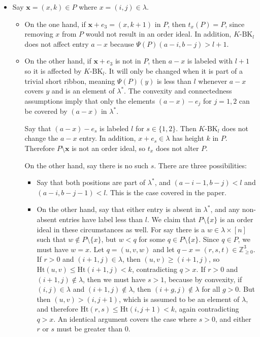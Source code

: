 \documentclass[10pt,letter]{article}
\begin{document}
\begin{itemize}
\item Say $\textbf{x} = (x,k) \in P$ where $x = (i,j) \in \lambda$. 
\begin{itemize}
\item On the one hand, if $\textbf{x} + e_3 = (x,k+1)$ in $P$, then $t_x(P) = P$, since removing $x$ from $P$ would not result in an order ideal. In addition, $K$-$\text{BK}_l$ does not affect entry $a-x$ because $\Psi(P)(a-i,b-j) > l+ 1$. 

\item On the other hand, if $\textbf{x} + e_3$ is not in $P$, then $a-x$ is labeled with $l+1$ so it is affected by $K$-$\text{BK}_l$.  It will only be changed when it is part of a trivial short ribbon, meaning $\Psi(P)(y)$ is less than $l$ whenever $a-x$ covers $y$ and is an element of $\lambda^{\ast}$. The convexity and connectedness assumptions imply that only the elements $(a-x)-e_j$ for $j = 1,2$ can be covered by $(a-x)$ in $\lambda^{\ast}$.

Say that $(a-x)-e_s$ is labeled $l$ for $s \in \lbrace 1,2 \rbrace$. Then $K$-$\text{BK}_l$ does not change the $a-x$ entry. In addition, $x+e_s \in \lambda$ has height $k$ in $P$. Therefore $P \setminus \textbf{x}$ is not an order ideal, so $t_x$ does not alter $P$. 

On the other hand, say there is no such $s$. There are three possibilities:
\begin{itemize}
\item Say that both positions are part of $\lambda^{\ast}$, and $(a-i-1,b-j) < l$ and $(a-i,b-j-1) < l$. This is the case covered in the paper.

\item  On the other hand, say that either entry is absent in $\lambda^{\ast}$, and any non-absent entries have label less than $l$. We claim that $P \setminus \lbrace x \rbrace$ is an order ideal in these circumstances as well. For say there is a $w \in \lambda \times [n]$ such that $w \not \in P \setminus \lbrace x \rbrace$, but $w < q$ for some $q \in P \setminus \lbrace x \rbrace$. Since $q \in P$, we must have $w = x$. Let $q = (u,v,w)$ and let $q - x = (r,s,t) \in \mathbb{Z}_{\geq 0}^3$. If $r > 0$ and $(i+1,j) \in \lambda$, then $(u,v) \geq (i+1,j)$, so $\text{Ht}(u,v) \leq \text{Ht}(i+1,j) < k$, contradicting $q > x$. If $r > 0$ and $(i+1,j) \not \in \lambda$, then we must have $s > 1$, because by convexity, if $(i,j) \in \lambda$ and $(i+1,j) \not \in \lambda$, then $(i+g,j) \not \in \lambda$ for all $g > 0$. But then $(u,v) > (i,j+1)$, which is assumed to be an element of $\lambda$, and therefore $\text{Ht}(r,s) \leq \text{Ht}(i,j+1) < k$, again contradicting $q > x$. An identical argument covers the case where $s > 0$, and either $r$ or $s$ must be greater than $0$. 


\end{itemize}
\end{itemize}
\end{itemize}
\end{document}
